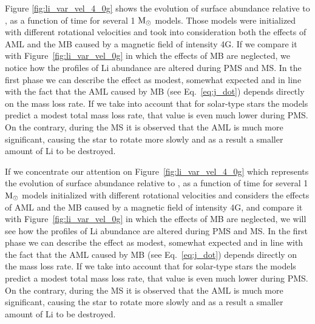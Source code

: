 \documentclass[fleqn,usenatbib]{mnras}
\begin{document}
{{Figure \ref{fig:li_var_vel_4_0g} shows the evolution of surface  abundance relative to , as a function of time for several 1 $\mathrm{M}_\odot$ models. Those models were initialized with different rotational velocities and took into consideration both the effects of AML and the MB caused by a magnetic field of intensity 4G. If we compare it with Figure~\ref{fig:li_var_vel_0g} in which the effects of MB are neglected, we notice how the profiles of Li abundance are altered during PMS and MS. In the first phase we can describe the effect as modest, somewhat expected and in line with the fact that the AML caused by MB (see Eq.~\ref{eq:j_dot}) depends directly on the mass loss rate. If we take into account that for solar-type stars the models predict a modest total mass loss rate, that value is even much lower during PMS. On the contrary, during the MS it is observed that the AML is much more significant, causing the star to rotate more slowly and as a result a smaller amount of Li to be destroyed.\par


If we concentrate our attention on Figure~\ref{fig:li_var_vel_4_0g} which represents the evolution of surface  abundance relative to , as a function of time for several 1 $\mathrm{M}_\odot$ models initialized with different rotational velocities and considers the effects of AML and the MB caused by a magnetic field of intensity 4G, and compare it with Figure~\ref{fig:li_var_vel_0g} in which the effects of MB are neglected, we will see how the profiles of Li abundance are altered during PMS and MS. In the first phase we can describe the effect as modest, somewhat expected and in line with the fact that the AML caused by MB (see Eq.~\ref{eq:j_dot}) depends directly on the mass loss rate. If we take into account that for solar-type stars the models predict a modest total mass loss rate, that value is even much lower during PMS. On the contrary, during the MS it is observed that the AML is much more significant, causing the star to rotate more slowly and as a result a smaller amount of Li to be destroyed.\par

}}
\end{document}
